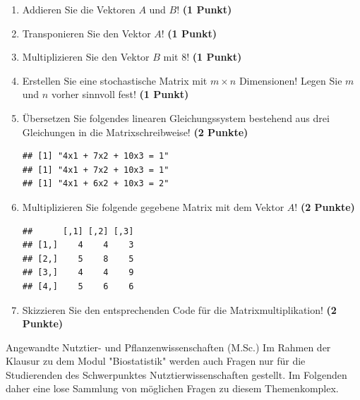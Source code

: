 \documentclass[a4paper, 9pt]{scrartcl}\usepackage[]{graphicx}\usepackage[]{xcolor}
\makeatletter
\newenvironment{kframe}{%
 \def\at@end@of@kframe{}%
 \ifinner\ifhmode%
  \def\at@end@of@kframe{\end{minipage}}%
  \begin{minipage}{\columnwidth}%
 \fi\fi%
 \def\FrameCommand##1{\hskip\@totalleftmargin \hskip-\fboxsep
 \colorbox{shadecolor}{##1}\hskip-\fboxsep
     \hskip-\linewidth \hskip-\@totalleftmargin \hskip\columnwidth}%
 \MakeFramed {\advance\hsize-\width
   \@totalleftmargin\z@ \linewidth\hsize
   \@setminipage}}%
 {\par\unskip\endMakeFramed%
 \at@end@of@kframe}
\newenvironment{knitrout}{}{} %
\makeatother
\begin{document}
\begin{enumerate}
\item Addieren Sie die Vektoren $A$ und $B$! \textbf{(1 Punkt)}
\item Transponieren Sie den Vektor $A$!
  \textbf{(1 Punkt)} 
\item Multiplizieren Sie den Vektor $B$ mit
  $8$! \textbf{(1 Punkt)}
\item Erstellen Sie eine stochastische Matrix mit $m \times n$ Dimensionen!
  Legen Sie $m$ und $n$ vorher sinnvoll fest! \textbf{(1 Punkt)}
\item {\"U}bersetzen Sie folgendes linearen Gleichungssystem bestehend aus drei
  Gleichungen in die Matrixschreibweise! \textbf{(2 Punkte)}
\begin{knitrout}
\color{fgcolor}\begin{kframe}
\begin{verbatim}
## [1] "4x1 + 7x2 + 10x3 = 1"
## [1] "4x1 + 7x2 + 10x3 = 1"
## [1] "4x1 + 6x2 + 10x3 = 2"
\end{verbatim}
\end{kframe}
\end{knitrout}
\item Multiplizieren Sie folgende gegebene Matrix mit dem Vektor $A$!
  \textbf{(2 Punkte)}
\begin{knitrout}
\color{fgcolor}\begin{kframe}
\begin{verbatim}
##      [,1] [,2] [,3]
## [1,]    4    4    3
## [2,]    5    8    5
## [3,]    4    4    9
## [4,]    5    6    6
\end{verbatim}
\end{kframe}
\end{knitrout}
\item Skizzieren Sie den entsprechenden \Rlogo Code f{\"u}r die
  Matrixmultiplikation! \textbf{(2 Punkte)}
\end{enumerate}
 
\clearpage
\begin{graybox}{Angewandte Nutztier- und Pflanzenwissenschaften (M.Sc.)}
  Im Rahmen der Klausur zu dem Modul "Biostatistik" werden auch Fragen
  nur für die Studierenden des Schwerpunktes Nutztierwissenschaften
  gestellt. Im Folgenden daher eine lose Sammlung von möglichen Fragen zu
  diesem Themenkomplex.
\end{graybox}
\clearpage
\end{document}
